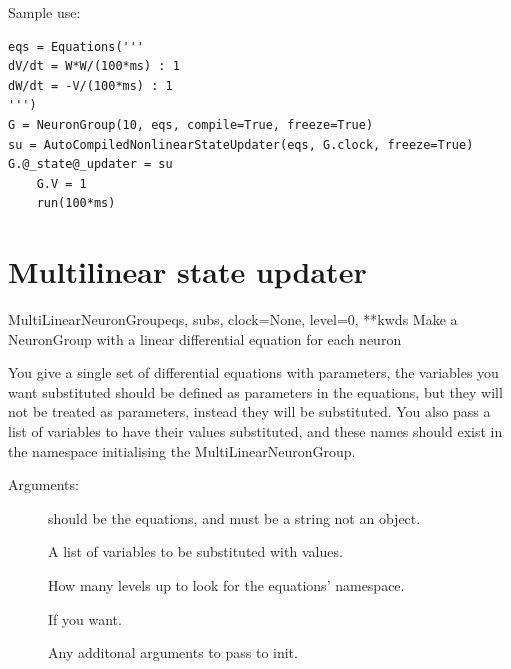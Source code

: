 \documentclass[letterpaper,10pt,english]{manual}
\begin{document}
Sample use:

\begin{Verbatim}[commandchars=@\[\]]
eqs = Equations('''
dV/dt = W*W/(100*ms) : 1
dW/dt = -V/(100*ms) : 1
''')
G = NeuronGroup(10, eqs, compile=True, freeze=True)
su = AutoCompiledNonlinearStateUpdater(eqs, G.clock, freeze=True)
G.@_state@_updater = su
    G.V = 1
    run(100*ms)
\end{Verbatim}

\resetcurrentobjects
\hypertarget{--doc-experimental-multilinearstateupdater}{}

\section{Multilinear state updater}

\hypertarget{brian.experimental.multilinearstateupdater.MultiLinearNeuronGroup}{}\begin{classdesc}{MultiLinearNeuronGroup}{eqs, subs, clock=None, level=0, **kwds}
Make a NeuronGroup with a linear differential equation for each neuron

You give a single set of differential equations with parameters, the
variables you want substituted should be defined as parameters in the equations,
but they will not be treated as parameters, instead they will be substituted.
You also pass a list of variables to have their values substituted, and these
names should exist in the namespace initialising the MultiLinearNeuronGroup.

Arguments:
\begin{description}
\item[] \leavevmode
should be the equations, and must be a string not an  object.

\item[] \leavevmode
A list of variables to be substituted with values.

\item[] \leavevmode
How many levels up to look for the equations' namespace.

\item[] \leavevmode
If you want.

\item[] \leavevmode
Any additonal arguments to pass to  init.

\end{description}
\end{classdesc}
\end{document}
